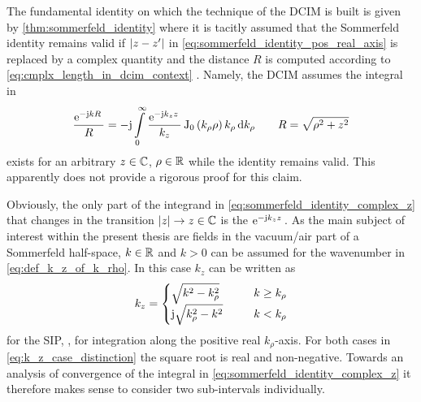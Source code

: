 The fundamental identity on which the technique of the \ac{DCIM} is built is
given by \cref{thm:sommerfeld_identity} where it is tacitly
assumed that the Sommerfeld identity remains valid if $\left\vert z-z^\prime\right\vert$ in
\eqref{eq:sommerfeld_identity_pos_real_axis} is replaced by a complex quantity
and the distance $R$ is computed according to
\eqref{eq:cmplx_length_in_dcim_context} \cite{Fang1988}.
Namely, the \ac{DCIM} assumes the integral in
\begin{equation}\label{eq:sommerfeld_identity_complex_z}
	\frac{\mathrm{e}^{-\mathrm{j} k R}\,}{R} = 
	-\mathrm{j}
	\int\limits_{0}^{\infty} 
	\frac{\mathrm{e}^{-\mathrm{j} k_z z}\,}{k_z}
	\operatorname{J}_{0} \left(k_\rho \rho\right)
	k_\rho 
	\,
	\mathrm{d} k_\rho
	\qquad
	R = \sqrt{\rho^2 + z^2}
\end{equation}
exists for an arbitrary $z \in \mathbb{C}$, $\rho \in \mathbb{R}$ while the identity remains
valid.
This apparently does not provide a rigorous proof for this claim.

Obviously, the only part of the integrand in
\eqref{eq:sommerfeld_identity_complex_z} that changes in the transition
$\left\vert z\right\vert \to z \in \mathbb{C}$ is the $\mathrm{e}^{-\mathrm{j} k_z z}\,$.
As the main subject of interest within the present thesis are fields in the
vacuum/air part of a Sommerfeld half-space, $k \in \mathbb{R}$ and $k > 0$ can be
assumed for the wavenumber in \eqref{eq:def_k_z_of_k_rho}.
In this case $k_z$ can be written as
\begin{equation}\label{eq:k_z_case_distinction}
	k_z =
	\begin{cases}
		\sqrt{k^2 - k_\rho^2}
		\qquad
		&k \geq k_\rho
		\\
		\mathrm{j}
		\sqrt{k_\rho^2 - k^2}
		&k < k_\rho
	\end{cases}
\end{equation}
for the \ac{SIP}, \ie, for integration along the positive real $k_\rho$-axis.
For both cases in \eqref{eq:k_z_case_distinction} the square root is real and 
non-negative.
Towards an analysis of convergence of the integral in
\eqref{eq:sommerfeld_identity_complex_z} it therefore makes sense to consider
two sub-intervals individually.

